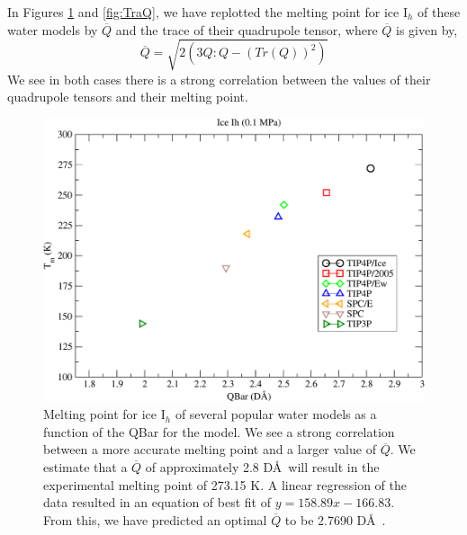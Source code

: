 In Figures \ref{fig:QBar} and \ref{fig:TraQ},
we have replotted the 
melting point for ice I$_h$ of these water models by $\overline{Q}$ and the 
trace of their
quadrupole tensor, where $\overline{Q}$ is given by,
\begin{equation}
\overline{Q} = \sqrt{2(3 Q:Q - (Tr(Q))^{2})}
\end{equation}
We see in both cases there is a strong correlation between
the values of their quadrupole tensors and their melting point.


\begin{figure}
\includegraphics[width=\linewidth]{Figures/Tm_Ih_Qbar_plot.pdf}
\caption{\label{fig:QBar} Melting point for ice I$_h$ of several
  popular water models as a function of the QBar for the model. We see
  a strong correlation between a more accurate melting point and a
  larger value of $\overline{Q}$. We estimate that a $\overline{Q}$ of
  approximately 2.8 D\AA~will result in the experimental melting point
  of 273.15 K. A linear regression of the data resulted in an equation
  of best fit of $y = 158.89x - 166.83$. From this, we have predicted
  an optimal $\overline{Q}$ to be 2.7690 D\AA~.}
\end{figure}

